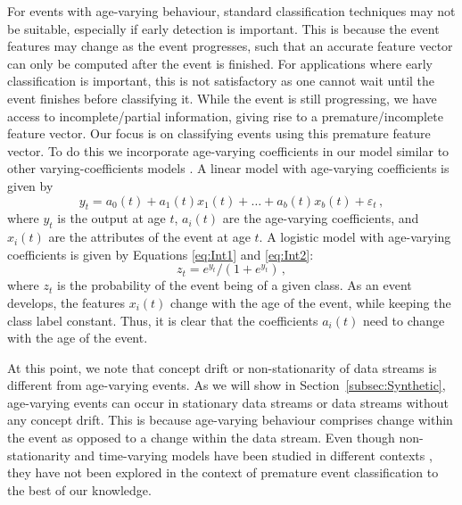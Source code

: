 \documentclass[a4paper,11pt]{article}
\begin{document}
For events with age-varying behaviour, standard classification techniques may not be suitable, especially if early detection is important. This is because the event features may change as the event progresses, such that an accurate feature vector can only be computed after the event is finished. For applications where early classification is important, this is not satisfactory as one cannot wait until the event finishes before classifying it. While the event is still progressing, we have access to incomplete/partial information, giving rise to a premature/incomplete feature vector. Our focus is on classifying events using this premature feature vector. To do this we incorporate age-varying coefficients in our model similar to other varying-coefficients models \cite{hastie1993varying}. A linear model with age-varying coefficients is given by
\begin{equation}\label{eq:Int1}
	y_t = a_0(t) + a_1(t) x_1(t) + \dots + a_b(t)x_b(t) + \varepsilon_t \, ,
\end{equation}
where $y_t$ is the output at age $t$, $a_i(t)$ are the age-varying coefficients, and $x_i(t)$ are the attributes of the event at age $t$. A logistic model with age-varying coefficients is given by Equations \eqref{eq:Int1} and \eqref{eq:Int2}:
\begin{equation}\label{eq:Int2}
	z_t = e^{y_t}/(1 + e^{y_t}) \, ,
\end{equation}
where $z_t$ is the probability of the event being of a given class. As an event develops, the features $x_i(t)$ change with the age of the event, while keeping the class label constant. Thus, it is clear that the coefficients $a_i(t)$ need to change with the age of the event.

At this point, we note that concept drift \cite{widmer1996learning, tsymbal2004problem,klinkenberg2000detecting,gama2014survey} or non-stationarity of data streams \cite{hulten2001mining, gama2010knowledge, gaber2005mining} is different from age-varying events. As we will show in Section~\ref{subsec:Synthetic}, age-varying events can occur in stationary data streams or data streams without any concept drift. This is because age-varying behaviour comprises change within the event as opposed to a change within the data stream. Even though non-stationarity and time-varying models have been studied in different contexts \cite{harvey1989time, wang1998cluster, hoover1998nonparametric}, they have not been explored in the context of premature event classification to the best of our knowledge.
\end{document}
